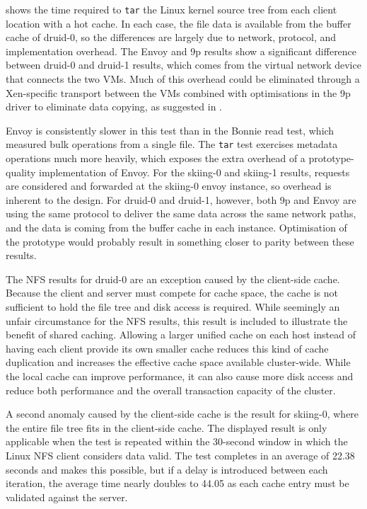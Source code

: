  shows the time required to \texttt{tar} the Linux kernel source tree from each client location with a hot cache. In each case, the file data is available from the buffer cache of druid-0, so the differences are largely due to network, protocol, and implementation overhead. The Envoy and 9p results show a significant difference between druid-0 and druid-1 results, which comes from the virtual network device that connects the two VMs. Much of this overhead could be eliminated through a Xen-specific transport between the VMs combined with optimisations in the 9p driver to eliminate data copying, as suggested in .

Envoy is consistently slower in this test than in the Bonnie read test, which measured bulk operations from a single file. The \texttt{tar} test exercises metadata operations much more heavily, which exposes the extra overhead of a prototype-quality implementation of Envoy. For the skiing-0 and skiing-1 results, requests are considered and forwarded at the skiing-0 envoy instance, so overhead is inherent to the design. For druid-0 and druid-1, however, both 9p and Envoy are using the same protocol to deliver the same data across the same network paths, and the data is coming from the buffer cache in each instance. Optimisation of the prototype would probably result in something closer to parity between these results.

The NFS results for druid-0 are an exception caused by the client-side cache. Because the client and server must compete for cache space, the cache is not sufficient to hold the file tree and disk access is required. While seemingly an unfair circumstance for the NFS results, this result is included to illustrate the benefit of shared caching. Allowing a larger unified cache on each host instead of having each client provide its own smaller cache reduces this kind of cache duplication and increases the effective cache space available cluster-wide. While the local cache can improve performance, it can also cause more disk access and reduce both performance and the overall transaction capacity of the cluster.

A second anomaly caused by the client-side cache is the result for skiing-0, where the entire file tree fits in the client-side cache. The displayed result is only applicable when the test is repeated within the 30-second window in which the Linux NFS client considers data valid. The test completes in an average of 22.38 seconds and makes this possible, but if a delay is introduced between each iteration, the average time nearly doubles to 44.05 as each cache entry must be validated against the server.

